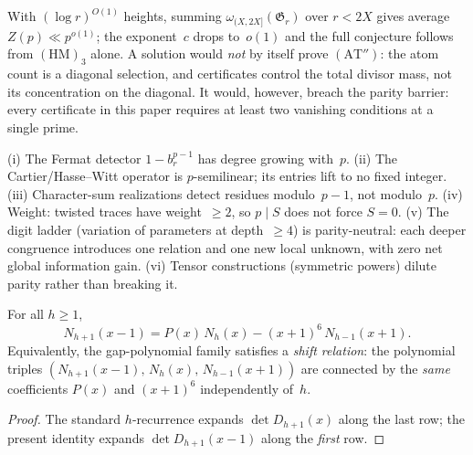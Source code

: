 \begin{remark}
With $(\log r)^{O(1)}$ heights,
summing $\omega_{(X,2X]}(\mathfrak G_r)$
over $r<2X$ gives average $Z(p)\ll p^{o(1)}$;
the exponent~$c$ drops to~$o(1)$ and the full
conjecture follows from $(\mathrm{HM})_3$ alone.
A solution would \emph{not} by itself prove $(\mathrm{AT}'')$:
the atom count is a diagonal selection,
and certificates control the total divisor mass,
not its concentration on the diagonal.
It would, however, breach the parity barrier:
every certificate in this paper requires
at least two vanishing conditions at a single prime.
\end{remark}

\begin{remark}
\textup{(i)} The Fermat detector $1-b_r^{p-1}$ has degree growing
with~$p$.
\textup{(ii)} The Cartier/Hasse--Witt operator is $p$-semilinear;
its entries lift to no fixed integer.
\textup{(iii)} Character-sum realizations detect residues
modulo~$p{-}1$, not modulo~$p$.
\textup{(iv)} Weight: twisted traces have weight~$\ge2$, so
$p\mid S$ does not force $S=0$.
\textup{(v)} The digit ladder (variation of parameters at
depth~$\ge4$) is parity-neutral: each deeper congruence introduces
one relation and one new local unknown, with zero net global
information gain.
\textup{(vi)} Tensor constructions (symmetric powers) dilute parity
rather than breaking it.
\end{remark}

\begin{proposition}
\label{prop:diagonal-transport}
For all $h \ge 1$,
\[
  N_{h+1}(x{-}1) = P(x)\,N_h(x) - (x{+}1)^6\,N_{h-1}(x{+}1).
\]
Equivalently, the gap-polynomial family satisfies a
\emph{shift relation}: the polynomial triples
$(N_{h+1}(x{-}1),\, N_h(x),\, N_{h-1}(x{+}1))$ are connected by the
\emph{same} coefficients $P(x)$ and $(x{+}1)^6$ independently of~$h$.
\end{proposition}

\begin{proof}
The standard $h$-recurrence expands
$\det D_{h+1}(x)$ along the last row;
the present identity expands $\det D_{h+1}(x{-}1)$
along the \emph{first} row.
\end{proof}
